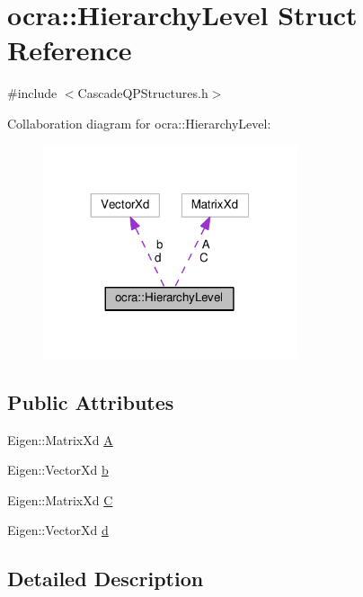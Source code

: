 \hypertarget{structocra_1_1HierarchyLevel}{}\section{ocra\+:\+:Hierarchy\+Level Struct Reference}
\label{structocra_1_1HierarchyLevel}


{\ttfamily \#include $<$Cascade\+Q\+P\+Structures.\+h$>$}



Collaboration diagram for ocra\+:\+:Hierarchy\+Level\+:
\nopagebreak
\begin{figure}[H]
\begin{center}
\leavevmode
\includegraphics[width=212pt]{d4/d30/structocra_1_1HierarchyLevel__coll__graph}
\end{center}
\end{figure}
\subsection*{Public Attributes}
\begin{DoxyCompactItemize}
\item 
Eigen\+::\+Matrix\+Xd \hyperlink{structocra_1_1HierarchyLevel_a19bc3f9c063348621857c7bcc5c391c7}{A}
\item 
Eigen\+::\+Vector\+Xd \hyperlink{structocra_1_1HierarchyLevel_aedcf136bbf54aa0ff910b3a3ce3d43be}{b}
\item 
Eigen\+::\+Matrix\+Xd \hyperlink{structocra_1_1HierarchyLevel_ad33118f78c391492062c6b3687c2e20d}{C}
\item 
Eigen\+::\+Vector\+Xd \hyperlink{structocra_1_1HierarchyLevel_ad1c6f525af33862743514fd5cf3e8c76}{d}
\end{DoxyCompactItemize}


\subsection{Detailed Description}


